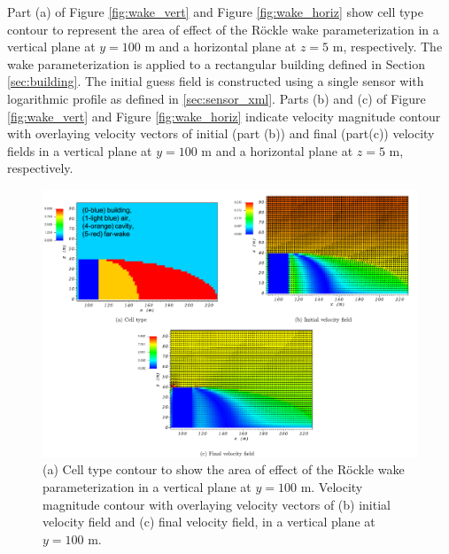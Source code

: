 Part (a) of Figure \ref{fig:wake_vert} and Figure \ref{fig:wake_horiz} show cell type contour to represent the area of effect of the R\"{o}ckle wake parameterization in a vertical plane at $y=100$ m and a horizontal plane at $z=5$ m, respectively. The wake parameterization is applied to a rectangular building defined in Section \ref{sec:building}. The initial guess field is constructed using a single sensor with logarithmic profile as defined in \ref{sec:sensor_xml}. Parts (b) and (c) of Figure \ref{fig:wake_vert} and Figure \ref{fig:wake_horiz} indicate velocity magnitude contour with overlaying velocity vectors of initial (part (b)) and final (part(c)) velocity fields in a vertical plane at $y=100$ m and a horizontal plane at $z=5$ m, respectively.

\begin{figure}[H]
    \centering
    \includegraphics[width=\textwidth]{Images/wake_y_100_1.pdf}
    \caption{(a) Cell type contour to show the area of effect of the R\"{o}ckle wake parameterization in a vertical plane at $y=100$ m. Velocity magnitude contour with overlaying velocity vectors of (b) initial velocity field and (c) final velocity field, in a vertical plane at $y=100$ m.}
\end{figure}

